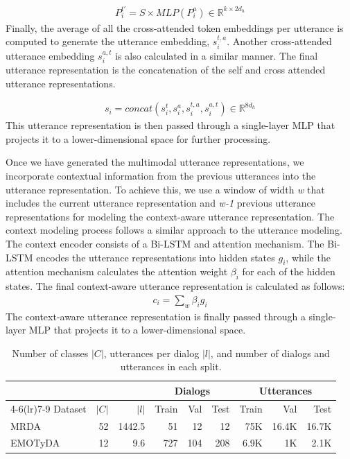 %
\begin{align}
P_{i}^{t'} = S \times MLP(P_{i}^{a}) \in \mathbb{R}^{k \times 2d_{h}}
\end{align}
%
Finally, the average of all the cross-attended token embeddings per utterance is computed to generate the utterance embedding, $s_{i}^{t,a}$. Another cross-attended utterance embedding $s_{i}^{a,t}$ is also calculated in a similar manner. The final utterance representation is the concatenation of the self and cross attended utterance representations.

%
\begin{align}
s_{i} = concat(s_{i}^{t}, s_{i}^{a}, s_{i}^{t,a}, s_{i}^{a,t}) \in \mathbb{R}^{8d_{h}}
\end{align}
%
This utterance representation is then
passed through a single-layer MLP that projects it to a lower-dimensional space for further processing.

Once we have generated the multimodal utterance representations, we incorporate contextual information from the previous utterances into the utterance representation.
To achieve this, we use a window of width \emph{w} that includes the current utterance representation and \emph{w-1} previous utterance representations for modeling the context-aware utterance representation. The context modeling process follows a similar approach to the utterance modeling.
The context encoder consists of a Bi-LSTM and attention mechanism.
The Bi-LSTM encodes the utterance representations into hidden states $g_{i}$, while the attention mechanism calculates the attention weight $\beta_{i}$ for each of the hidden states.
The final context-aware utterance representation is calculated as follows:
%
\begin{align}
c_{i} = \sum_w \beta_{i} g_{i}
\end{align}
%
The context-aware utterance representation is finally passed through a single-layer MLP that projects it to a lower-dimensional space.


\begin{table}
\centering
\begin{tabular}{lrrrrrrrr}
\toprule
\multicolumn{3}{c}{} & \multicolumn{3}{c}{Dialogs} & \multicolumn{3}{c}{Utterances} \\
\cmidrule(lr){4-6}\cmidrule(lr){7-9}
Dataset & $|C|$ & $|l|$ & Train & Val & Test & Train & Val & Test \\
\midrule
MRDA & 52 & 1442.5 & 51 & 12 & 12 & 75K & 16.4K & 16.7K \\
EMOTyDA & 12 & 9.6 & 727 & 104 & 208 & 6.9K & 1K & 2.1K \\
\bottomrule
\end{tabular}
\caption{Number of classes $|C|$, utterances per dialog $|l|$, and number of dialogs and utterances in each split.}
\label{tab:DA_dist}
\end{table}


